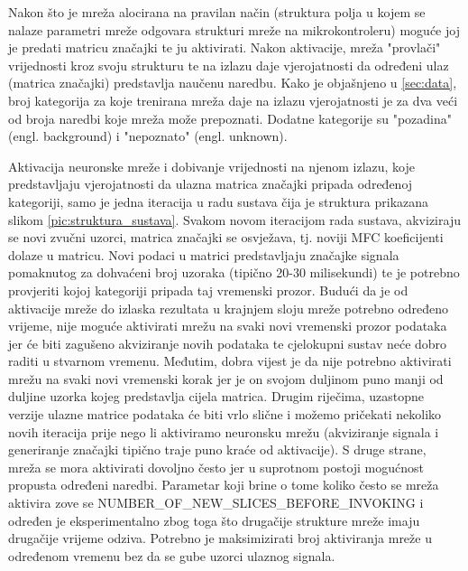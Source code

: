Nakon što je mreža alocirana na pravilan način (struktura polja u kojem se nalaze parametri
mreže odgovara strukturi mreže na mikrokontroleru) moguće joj je predati matricu značajki
te ju aktivirati. Nakon aktivacije, mreža "provlači" vrijednosti kroz svoju strukturu te na
izlazu daje vjerojatnosti da određeni ulaz (matrica značajki) predstavlja naučenu naredbu. 
Kako je objašnjeno u \ref{sec:data}, broj kategorija za koje trenirana mreža daje na izlazu
vjerojatnosti je za dva veći od broja naredbi koje mreža može prepoznati. Dodatne kategorije
su "pozadina" (engl. background) i "nepoznato" (engl. unknown). 

Aktivacija neuronske mreže i dobivanje vrijednosti na njenom izlazu, koje predstavljaju
vjerojatnosti da ulazna matrica značajki pripada određenoj kategoriji, samo je jedna iteracija 
u radu sustava čija je struktura prikazana slikom \ref{pic:struktura_sustava}. Svakom novom 
iteracijom rada sustava, akviziraju se novi zvučni uzorci, matrica značajki se osvježava, 
tj. noviji MFC koeficijenti dolaze u matricu. Novi podaci u matrici predstavljaju značajke 
signala pomaknutog za dohvaćeni broj uzoraka (tipično 20-30 milisekundi) te je potrebno provjeriti
kojoj kategoriji pripada taj vremenski prozor. Budući da je od aktivacije mreže do izlaska 
rezultata u krajnjem sloju mreže potrebno određeno vrijeme, nije moguće aktivirati mrežu 
na svaki novi vremenski prozor podataka jer će biti zagušeno akviziranje novih podataka
te cjelokupni sustav neće dobro raditi u stvarnom vremenu. Međutim, dobra vijest je da
nije potrebno aktivirati mrežu na svaki novi vremenski korak jer je on svojom duljinom
puno manji od duljine uzorka kojeg predstavlja cijela matrica. Drugim riječima, uzastopne
verzije ulazne matrice podataka će biti vrlo slične i možemo pričekati nekoliko novih
iteracija prije nego li aktiviramo neuronsku mrežu (akviziranje signala i generiranje značajki
tipično traje puno kraće od aktivacije). S druge strane, mreža se mora aktivirati dovoljno
često jer u suprotnom postoji mogućnost propusta određeni naredbi. Parametar koji brine o tome 
koliko često se mreža aktivira zove se NUMBER\_OF\_NEW\_SLICES\_BEFORE\_INVOKING i određen
je eksperimentalno zbog toga što drugačije strukture mreže imaju drugačije vrijeme odziva.
Potrebno je maksimizirati broj aktiviranja mreže u određenom vremenu bez da se gube
uzorci ulaznog signala.

